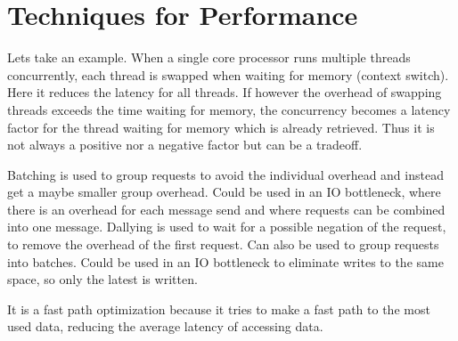 \documentclass[a4paper, 11pt]{article}
\begin{document}
\section{Techniques for Performance} %
\label{sec:techniques_for_performance}

Lets take an example. When a single core processor runs multiple threads concurrently, each thread is swapped when waiting for memory (context switch). Here it reduces the latency for all threads. If however the overhead of swapping threads exceeds the time waiting for memory, the concurrency becomes a latency factor for the thread waiting for memory which is already retrieved. Thus it is not always a positive nor a negative factor but can be a tradeoff.

Batching is used to group requests to avoid the individual overhead and instead get a maybe smaller group overhead. Could be used in an IO bottleneck, where there is an overhead for each message send and where requests can be combined into one message.%
Dallying is used to wait for a possible negation of the request, to remove the overhead of the first request. Can also be used to group requests into batches. Could be used in an IO bottleneck to eliminate writes to the same space, so only the latest is written.

It is a fast path optimization because it tries to make a fast path to the most used data, reducing the average latency of accessing data.

\end{document}
